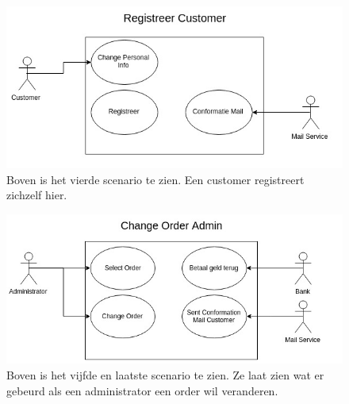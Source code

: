 \documentclass[•]{article}
\begin{document}
\begin{figure}
\centering
\includegraphics[width=13.5cm]{scenario4_registreer.jpeg}
\caption{Boven is het vierde scenario te zien. Een customer registreert zichzelf hier.}
\label{scenario4}
\end{figure}
\begin{figure}
\centering
\includegraphics[width=13.5cm]{scenario5.jpg}
\caption{Boven is het vijfde en laatste scenario te zien. Ze laat zien wat er gebeurd als een administrator een order wil veranderen.}
\label{scenario5}
\end{figure}


\newpage
\end{document}
